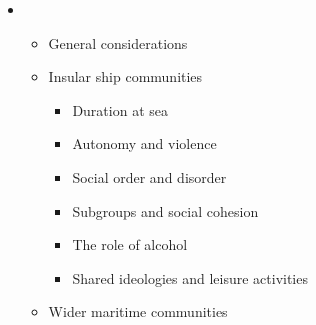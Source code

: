 \setcounter{itemize}{3}
\begin{itemize}
\item \begin{itemize}
\item \begin{styleListParagraph}
General considerations
\end{styleListParagraph}
\item \begin{styleListParagraph}
Insular ship communities 
\end{styleListParagraph}

\begin{itemize}
\item \begin{styleListParagraph}
Duration at sea
\end{styleListParagraph}
\item \begin{styleListParagraph}
Autonomy and violence
\end{styleListParagraph}
\item \begin{styleListParagraph}
Social order and disorder 
\end{styleListParagraph}
\item \begin{styleListParagraph}
Subgroups and social cohesion
\end{styleListParagraph}
\item \begin{styleListParagraph}
The role of alcohol
\end{styleListParagraph}
\item \begin{styleListParagraph}
Shared ideologies and leisure activities 
\end{styleListParagraph}
\end{itemize}
\item \begin{styleListParagraph}
Wider maritime communities 
\end{styleListParagraph}


\end{itemize}
\end{itemize}
